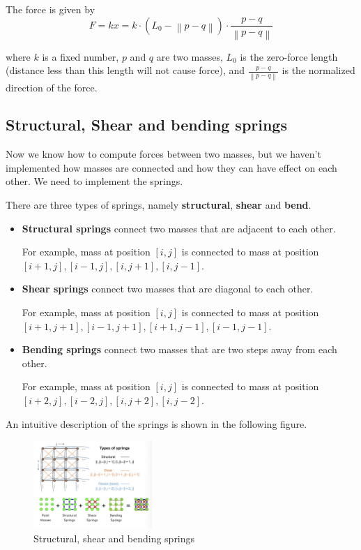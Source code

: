 \documentclass[acmtog]{acmart}
\begin{document}
The force is given by \[
	F = kx = k\cdot 
	\left(L_0 - \left\| p-q \right\|\right) \cdot 
	\frac{p-q}{\left\| p-q \right\|}
\]

where $k$ is a fixed number, $p$ and $q$ are two masses, $L_0$ is the zero-force length (distance less than this length will not cause force), and $\frac{p-q}{\left\| p-q \right\|}$ is the normalized direction of the force.

\subsection{Structural, Shear and bending springs}

Now we know how to compute forces between two masses, but we haven't implemented how masses are connected and how they can have effect on each other. We need to implement the springs.

There are three types of springs, namely \textbf{structural}, \textbf{shear} and \textbf{bend}.

\begin{itemize}
	\item \textbf{Structural springs} connect two masses that are adjacent to each other.
	
	For example, mass at position $[i,j]$ is connected to mass at position $[i+1,j], [i-1, j], [i, j+1], [i,j-1]$.

	\item \textbf{Shear springs} connect two masses that are diagonal to each other.
	
	For example, mass at position $[i,j]$ is connected to mass at position $[i+1,j+1], [i-1, j+1], [i+1, j-1], [i-1,j-1]$.
	\item \textbf{Bending springs} connect two masses that are two steps away from each other.
	
	For example, mass at position $[i,j]$ is connected to mass at position $[i+2,j], [i-2, j], [i, j+2], [i,j-2]$.
\end{itemize}

An intuitive description of the springs is shown in the following figure.

\begin{figure}[htbp]
	\centering
	\includegraphics[width=0.4\textwidth]{images/spring-force.jpg}
	\caption{Structural, shear and bending springs}
\end{figure}
\end{document}
